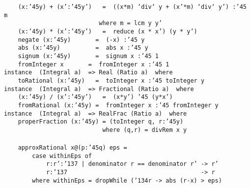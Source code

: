 {\mbox{\tt \ \ \ \ (x:{\char'45}y)\ +\ (x':{\char'45}y')\ \ \ =\ \ ((x*m)\ `div`\ y\ +\ (x'*m)\ `div`\ y')\ :{\char'45}\ m}\\
\mbox{\tt \ \ \ \ \ \ \ \ \ \ \ \ \ \ \ \ \ \ \ \ \ \ \ \ \ \ \ where\ m\ =\ lcm\ y\ y'}\\
\mbox{\tt \ \ \ \ (x:{\char'45}y)\ *\ (x':{\char'45}y')\ \ \ =\ \ reduce\ (x\ *\ x')\ (y\ *\ y')}\\
\mbox{\tt \ \ \ \ negate\ (x:{\char'45}y)\ \ \ \ \ \ \ =\ \ (-x)\ :{\char'45}\ y}\\
\mbox{\tt \ \ \ \ abs\ (x:{\char'45}y)\ \ \ \ \ \ \ \ \ \ =\ \ abs\ x\ :{\char'45}\ y}\\
\mbox{\tt \ \ \ \ signum\ (x:{\char'45}y)\ \ \ \ \ \ \ =\ \ signum\ x\ :{\char'45}\ 1}\\
\mbox{\tt \ \ \ \ fromInteger\ x\ \ \ \ \ \ \ =\ \ fromInteger\ x\ :{\char'45}\ 1}
\eprogB\noindent\bprogB
\mbox{\tt instance\ \ (Integral\ a)\ \ =>\ Real\ (Ratio\ a)\ \ where}\\
\mbox{\tt \ \ \ \ toRational\ (x:{\char'45}y)\ \ \ =\ \ toInteger\ x\ :{\char'45}\ toInteger\ y}
\eprogB\noindent\bprogB
\mbox{\tt instance\ \ (Integral\ a)\ \ =>\ Fractional\ (Ratio\ a)\ \ where}\\
\mbox{\tt \ \ \ \ (x:{\char'45}y)\ /\ (x':{\char'45}y')\ \ \ =\ \ (x*y')\ {\char'45}\ (y*x')}\\
\mbox{\tt \ \ \ \ fromRational\ (x:{\char'45}y)\ =\ \ fromInteger\ x\ :{\char'45}\ fromInteger\ y}
\eprogB\noindent\bprogB
\mbox{\tt instance\ \ (Integral\ a)\ \ =>\ RealFrac\ (Ratio\ a)\ \ where}\\
\mbox{\tt \ \ \ \ properFraction\ (x:{\char'45}y)\ =\ (toInteger\ q,\ r:{\char'45}y)}\\
\mbox{\tt \ \ \ \ \ \ \ \ \ \ \ \ \ \ \ \ \ \ \ \ \ \ \ \ \ \ \ \ where\ (q,r)\ =\ divRem\ x\ y}\\
\mbox{\tt }\\
\mbox{\tt \ \ \ \ approxRational\ x@(p:{\char'45}q)\ eps\ =}\\
\mbox{\tt \ \ \ \ \ \ \ \ case\ withinEps\ of}\\
\mbox{\tt \ \ \ \ \ \ \ \ \ \ \ \ r:r':{\char'137}\ |\ denominator\ r\ ==\ denominator\ r'\ ->\ r'}\\
\mbox{\tt \ \ \ \ \ \ \ \ \ \ \ \ r:{\char'137}\ \ \ \ \ \ \ \ \ \ \ \ \ \ \ \ \ \ \ \ \ \ \ \ \ \ \ \ \ \ \ \ \ \ \ \ \ \ ->\ r}\\
\mbox{\tt \ \ \ \ \ \ \ \ where\ withinEps\ =\ dropWhile\ ({\char'134}r\ ->\ abs\ (r-x)\ >\ eps)}\\
}

